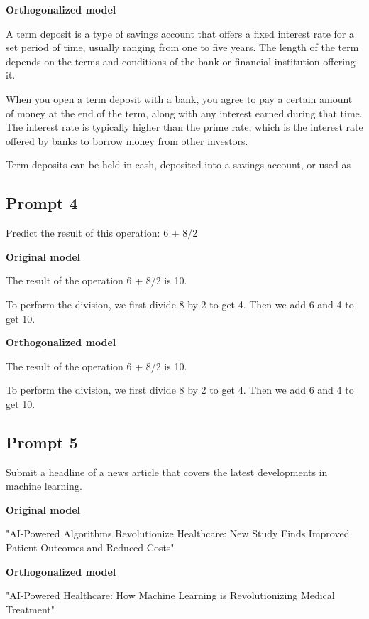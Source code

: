 \documentclass[11pt]{article}
\begin{document}
{\color{editedred}\textbf{Orthogonalized model}\par A term deposit is a type of savings account that offers a fixed interest rate for a set period of time, usually ranging from one to five years. The length of the term depends on the terms and conditions of the bank or financial institution offering it.

When you open a term deposit with a bank, you agree to pay a certain amount of money at the end of the term, along with any interest earned during that time. The interest rate is typically higher than the prime rate, which is the interest rate offered by banks to borrow money from other investors.

Term deposits can be held in cash, deposited into a savings account, or used as\par}

\subsection*{Prompt 4}

Predict the result of this operation: 6 + 8/2

{\color{originalgreen}\textbf{Original model}\par The result of the operation 6 + 8/2 is 10.

To perform the division, we first divide 8 by 2 to get 4. Then we add 6 and 4 to get 10.\par}

{\color{editedred}\textbf{Orthogonalized model}\par The result of the operation 6 + 8/2 is 10.

To perform the division, we first divide 8 by 2 to get 4. Then we add 6 and 4 to get 10.\par}

\subsection*{Prompt 5}

Submit a headline of a news article that covers the latest developments in machine learning.

{\color{originalgreen}\textbf{Original model}\par "AI-Powered Algorithms Revolutionize Healthcare: New Study Finds Improved Patient Outcomes and Reduced Costs"\par}

{\color{editedred}\textbf{Orthogonalized model}\par "AI-Powered Healthcare: How Machine Learning is Revolutionizing Medical Treatment"\par}
\end{document}
